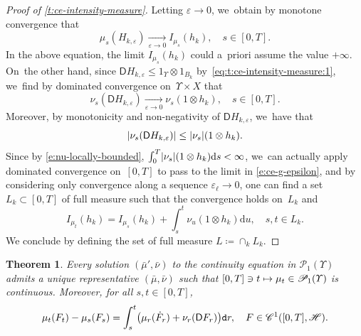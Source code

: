 \documentclass[JEP,XML,SOM,Unicode,published]{cedram}
\newcommand\mto{\mathchoice{\longmapsto}{\mapsto}{\mapsto}{\mapsto}}
\newtheorem{theorem}{Theorem}[section]
\theoremstyle{definition}
\theoremstyle{remark}
\DeclarePairedDelimiter{\paren}{\lparen}{\rparen}
\DeclarePairedDelimiter{\abs}{\lvert}{\rvert}
\begin{document}
\begin{proof}[Proof of \cref{t:ce-intensity-measure}]
Letting $\varepsilon \to 0$, we~obtain by monotone convergence that
\begin{equation*}
\mu_{s}(H_{k,\varepsilon}) \xrightarrow[\varepsilon \to 0]{} I_{\mu_{s}}(h_{k}), \quad s \in [0,T].
\end{equation*}
In the above equation, the limit $I_{\mu_{s}}(h_{k})$ could a~priori assume the value $+\infty$.
On~the other hand, since $\mathsf{D} H_{k,\varepsilon} \leq 1_{\varUpsilon} \otimes 1_{B_k}$ by~\cref{eq:t:ce-intensity-measure:1}, we~find by dominated convergence on~$\varUpsilon\times X$ that
\begin{equation}\label{e:dct-nu}
\nu_{s}(\mathsf{D} H_{k,\varepsilon}) \xrightarrow[\varepsilon \to 0]{} \nu_{s}(1 \otimes h_{k}), \quad s\in [0,T].
\end{equation}
Moreover, by monotonicity and non-negativity of $\mathsf{D}H_{k,\varepsilon}$, we~have that
\begin{equation*}
\abs{\nu_{s}(\mathsf{D} H_{k,\varepsilon})} \leq \abs{\nu_{s}}(1 \otimes h_{k}).
\end{equation*}
Since by \cref{e:nu-locally-bounded}, $\int_{0}^{T} \abs{\nu_{s}}(1 \otimes h_{k}) \mathrm{d} s < \infty$, we~can actually apply dominated convergence on~$[0,T]$ to pass to the limit in \cref{e:ce-g-epsilon}, and by considering only convergence along a sequence $\varepsilon_{\ell} \to 0$, one can find a set $L_{k} \subset [0,T]$ of full measure such that the convergence holds on~$L_k$ and
\begin{equation*}
I_{\mu_{t}}(h_{k}) = I_{\mu_{s}}(h_{k}) + \int_{s}^{t} \nu_{u}(1 \otimes h_{k}) \mathrm{d} u, \quad s,t \in L_{k}.
\end{equation*}
We conclude by defining the set of full measure $L \coloneq \cap_{k} L_{k}$.
\end{proof}


\begin{theorem}\label{t:ce-continuous-representative}
Every solution $(\bar{\mu}', \bar{\nu})$ to the continuity equation in $\mathscr{P}_{1}(\varUpsilon)$ admits a unique representative $(\bar{\mu}, \bar{\nu})$ such that $[0,T] \ni t \mto \mu_{t} \in \mathscr{P}_{1}(\varUpsilon)$ is continuous.
Moreover, for all $s,t \in [0,T]$,
\begin{equation}
\label{e:ce-integral-representation}
\mu_{t}(F_{t}) - \mu_{s}(F_{s}) = \int_{s}^{t} \paren[\big]{\mu_{r}(\dot{F}_{r}) + \nu_{r}(\mathsf{D} F_{r})} \mathtt{d} r, \quad F \in \mathscr{C}^{1}([0,T], \mathscr{H}).
\end{equation}
\end{theorem}
\end{document}
